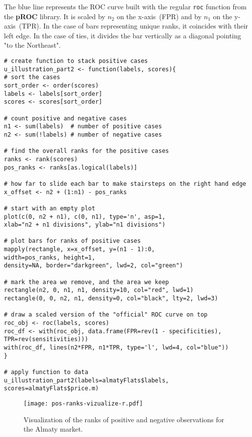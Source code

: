 \documentclass[]{scrreprt}
\begin{document}
The blue line represents the ROC curve built with the regular \texttt{roc} function from the \textbf{pROC} library. It is scaled by $n_{2}$ on the x-axis~(FPR) and by $n_{1}$ on the y-axis~(TPR). In the case of bars representing unique ranks, it coincides with their left edge. In the case of ties, it divides the bar vertically as a diagonal pointing "to the Northeast".
%
\begin{lstlisting}[float=htp, caption = Visualization of the ranks of positive and negative observations for the Almaty market, firstnumber=1, label= lst:vizualize-pos-cases-almaty-R]
# create function to stack positive cases
u_illustration_part2 <- function(labels, scores){
# sort the cases
sort_order <- order(scores)
labels <- labels[sort_order]
scores <- scores[sort_order]

# count positive and negative cases
n1 <- sum(labels)  # number of positive cases
n2 <- sum(!labels) # number of negative cases

# find the overall ranks for the positive cases
ranks <- rank(scores)
pos_ranks <- ranks[as.logical(labels)]

# how far to slide each bar to make stairsteps on the right hand edge
x_offset <- n2 + (1:n1) - pos_ranks

# start with an empty plot  
plot(c(0, n2 + n1), c(0, n1), type='n', asp=1,
xlab="n2 + n1 divisions", ylab="n1 divisions")

# plot bars for ranks of positive cases
mapply(rectangle, x=x_offset, y=(n1 - 1):0, 
width=pos_ranks, height=1,
density=NA, border="darkgreen", lwd=2, col="green")

# mark the area we remove, and the area we keep
rectangle(n2, 0, n1, n1, density=10, col="red", lwd=1)
rectangle(0, 0, n2, n1, density=0, col="black", lty=2, lwd=3)

# draw a scaled version of the "official" ROC curve on top
roc_obj <- roc(labels, scores)
roc_df <- with(roc_obj, data.frame(FPR=rev(1 - specificities), 
TPR=rev(sensitivities)))
with(roc_df, lines(n2*FPR, n1*TPR, type='l', lwd=4, col="blue"))
}

# apply function to data
u_illustration_part2(labels=almatyFlats$labels, scores=almatyFlats$price.m)
\end{lstlisting}
%
\begin{figure}[htp]
	\centering
	\texttt{[image: pos-ranks-vizualize-r.pdf]}
	\caption{Visualization of the ranks of positive and negative observations for the Almaty market.}
	\label{fig:pos-ranks-vizualize-r.pdf}
\end{figure}
%
\clearpage
%
\end{document}
